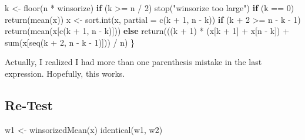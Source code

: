\documentclass[
]{article}
\newenvironment{Shaded}{\begin{snugshade}}{\end{snugshade}}
\newcommand{\AttributeTok}[1]{\textcolor[rgb]{0.77,0.63,0.00}{#1}}
\newcommand{\ControlFlowTok}[1]{\textcolor[rgb]{0.13,0.29,0.53}{\textbf{#1}}}
\newcommand{\DecValTok}[1]{\textcolor[rgb]{0.00,0.00,0.81}{#1}}
\newcommand{\FunctionTok}[1]{\textcolor[rgb]{0.00,0.00,0.00}{#1}}
\newcommand{\NormalTok}[1]{#1}
\newcommand{\OtherTok}[1]{\textcolor[rgb]{0.56,0.35,0.01}{#1}}
\newcommand{\SpecialCharTok}[1]{\textcolor[rgb]{0.00,0.00,0.00}{#1}}
\newcommand{\StringTok}[1]{\textcolor[rgb]{0.31,0.60,0.02}{#1}}
\begin{document}
\begin{Shaded}
\begin{Highlighting}[]
\NormalTok{    k }\OtherTok{\textless{}{-}} \FunctionTok{floor}\NormalTok{(n }\SpecialCharTok{*}\NormalTok{ winsorize)}
    \ControlFlowTok{if}\NormalTok{ (k }\SpecialCharTok{\textgreater{}=}\NormalTok{ n }\SpecialCharTok{/} \DecValTok{2}\NormalTok{) }\FunctionTok{stop}\NormalTok{(}\StringTok{"winsorize too large"}\NormalTok{)}
    \ControlFlowTok{if}\NormalTok{ (k }\SpecialCharTok{==} \DecValTok{0}\NormalTok{) }\FunctionTok{return}\NormalTok{(}\FunctionTok{mean}\NormalTok{(x))}
\NormalTok{    x }\OtherTok{\textless{}{-}} \FunctionTok{sort.int}\NormalTok{(x, }\AttributeTok{partial =} \FunctionTok{c}\NormalTok{(k }\SpecialCharTok{+} \DecValTok{1}\NormalTok{, n }\SpecialCharTok{{-}}\NormalTok{ k))}
    \ControlFlowTok{if}\NormalTok{ (k }\SpecialCharTok{+} \DecValTok{2} \SpecialCharTok{\textgreater{}=}\NormalTok{ n }\SpecialCharTok{{-}}\NormalTok{ k }\SpecialCharTok{{-}} \DecValTok{1}\NormalTok{)}
        \FunctionTok{return}\NormalTok{(}\FunctionTok{mean}\NormalTok{(x[}\FunctionTok{c}\NormalTok{(k }\SpecialCharTok{+} \DecValTok{1}\NormalTok{, n }\SpecialCharTok{{-}}\NormalTok{ k)]))}
    \ControlFlowTok{else}
        \FunctionTok{return}\NormalTok{(((k }\SpecialCharTok{+} \DecValTok{1}\NormalTok{) }\SpecialCharTok{*}\NormalTok{ (x[k }\SpecialCharTok{+} \DecValTok{1}\NormalTok{] }\SpecialCharTok{+}\NormalTok{ x[n }\SpecialCharTok{{-}}\NormalTok{ k]) }\SpecialCharTok{+}
            \FunctionTok{sum}\NormalTok{(x[}\FunctionTok{seq}\NormalTok{(k }\SpecialCharTok{+} \DecValTok{2}\NormalTok{, n }\SpecialCharTok{{-}}\NormalTok{ k }\SpecialCharTok{{-}} \DecValTok{1}\NormalTok{)])) }\SpecialCharTok{/}\NormalTok{ n)}
\NormalTok{\}}
\end{Highlighting}
\end{Shaded}

Actually, I realized I had more than one parenthesis mistake in the last
expression. Hopefully, this works.

\hypertarget{re-test}{%
\subsection{Re-Test}\label{re-test}}

\begin{Shaded}
\begin{Highlighting}[]
\NormalTok{w1 }\OtherTok{\textless{}{-}} \FunctionTok{winsorizedMean}\NormalTok{(x)}
\FunctionTok{identical}\NormalTok{(w1, w2)}
\end{Highlighting}
\end{Shaded}
\end{document}
